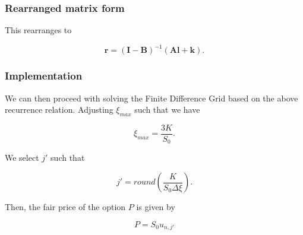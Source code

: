 \documentclass{beamer}
\begin{document}
  \begin{frame}
    \frametitle{Rearranged matrix form}
    This rearranges to

    \begin{equation}
      \textbf{r} = (\textbf{I} - \textbf{B})^{-1}(\textbf{Al}+\textbf{k}).
    \end{equation}
  \end{frame}

  \begin{frame}
    \frametitle{Implementation}
    We can then proceed with solving the Finite Difference Grid based on the above recurrence relation. Adjusting \(\xi_{max}\) such that we have

    \begin{equation}
      \xi_{max} = \frac{3K}{S_0}.
    \end{equation}

    We select \(j'\) such that

    \begin{equation}
      j' = round(\frac{K}{S_0\Delta\xi}).
    \end{equation}

    Then, the fair price of the option \(P\) is given by

    \begin{equation}
      P = S_0 u_{n, j'}
    \end{equation}
  \end{frame}
\end{document}
